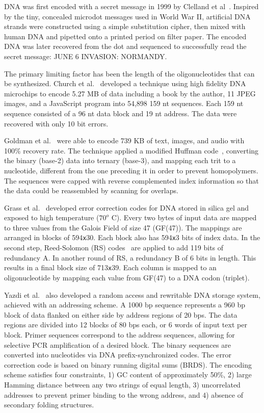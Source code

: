 \documentclass{bioinfo}
\begin{document}
DNA was first encoded with a secret message in 1999 by Clelland et al~\cite{CRB1999N}. Inspired by the tiny, concealed microdot messages used in World War II, artificial DNA strands were constructed using a simple substitution cipher, then mixed with human DNA and pipetted onto a printed period on filter paper. The encoded DNA was later recovered from the dot and sequenced to successfully read the secret message: JUNE 6 INVASION: NORMANDY.

The primary limiting factor has been the length of the oligonucleotides that can be synthesized. Church et al.~\cite{CHURCH2012} developed a technique using high fidelity DNA microchips to encode 5.27 MB of data including a book by the author, 11 JPEG images, and a JavaScript program into 54,898 159 nt sequences. Each 159 nt sequence consisted of a 96 nt data block and 19 nt address. The data were recovered with only 10 bit errors.

Goldman et al.~\cite{GOLDMAN2013} were able to encode 739 KB of text, images, and audio with 100\% recovery rate. The technique applied a modified Huffman code~\cite{H1952POTIRE}, converting the binary (base-2) data into ternary (base-3), and mapping each trit to a nucleotide, different from the one preceding it in order to prevent homopolymers. The sequences were capped with reverse complemented index information so that the data could be reassembled by scanning for overlaps.

Grass et al.~\cite{GRASS2015} developed error correction codes for DNA stored in silica gel and exposed to high temperature ($70^o$ C). Every two bytes of input data are mapped to three values from the Galois Field of size 47 (GF(47)). The mappings are arranged in blocks of 594\texttt{x}30. Each block also has 594\texttt{x}3 bits of index data. In the second step, Reed-Solomon (RS) codes~\cite{REED1960} are applied to add 119 bits of redundancy A. In another round of RS, a redundancy B of 6 bits in length. This results in a final block size of 713\texttt{x}39. Each column is mapped to an oligonucleotide by mapping each value from GF(47) to a DNA codon (triplet).

Yazdi et al.~\cite{YAZDI2015} also developed a random access and rewritable DNA storage system, achieved with an addressing scheme. A 1000 bp sequence represents a 960 bp block of data flanked on either side by address regions of 20 bps. The data regions are divided into 12 blocks of 80 bps each, or 6 words of input text per block. Primer sequences correspond to the address sequences, allowing for selective PCR amplification of a desired block. The binary sequences are converted into nucleotides via DNA prefix-synchronized codes. The error correction code is based on binary running digital sums (BRDS). The encoding scheme satisfies four constraints, 1) GC content of approximately 50\%, 2) large Hamming distance between any two strings of equal length, 3) uncorrelated addresses to prevent primer binding to the wrong address, and 4) absence of secondary folding structures.
\end{document}
